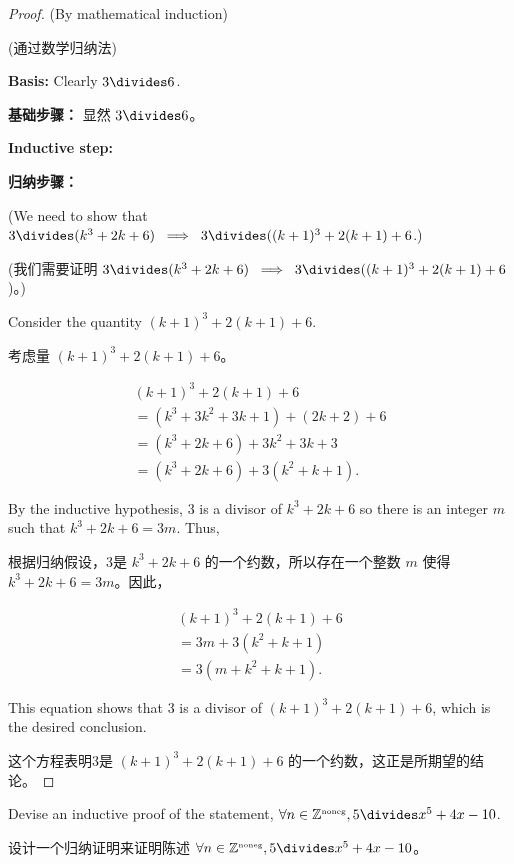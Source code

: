\begin{proof}
(By mathematical induction)

(通过数学归纳法)

{\bf Basis:} Clearly $3 \divides 6$.

{\bf 基础步骤：} 显然 $3 \divides 6$。

{\bf Inductive step:} 

{\bf 归纳步骤：}

\noindent (We need to show that $3 \divides (k^3 + 2k + 6) \; \implies \; 3 \divides ((k+1)^3 + 2(k+1) + 6$.)

\noindent (我们需要证明 $3 \divides (k^3 + 2k + 6) \; \implies \; 3 \divides ((k+1)^3 + 2(k+1) + 6$)。)

Consider the quantity $(k+1)^3 + 2(k+1) + 6$.

考虑量 $(k+1)^3 + 2(k+1) + 6$。

\begin{gather*}
   (k+1)^3 + 2(k+1) + 6 \\
 = (k^3 + 3k^2 + 3k + 1) + (2k + 2) + 6\\
 = (k^3 + 2k + 6) + 3k^2 + 3k + 3\\
 = (k^3 + 2k + 6) + 3(k^2 + k + 1).
\end{gather*}

By the inductive hypothesis, 3 is a divisor of $k^3 + 2k + 6$ so there
is an integer $m$ such that $k^3 + 2k + 6 = 3m$.
Thus,

根据归纳假设，3是 $k^3 + 2k + 6$ 的一个约数，所以存在一个整数 $m$ 使得 $k^3 + 2k + 6 = 3m$。因此，

\begin{gather*}
(k+1)^3 + 2(k+1) + 6 \\
= 3m + 3(k^2 + k + 1) \\
= 3(m + k^2 + k + 1).
\end{gather*}

This equation shows that 3 is a divisor of $(k+1)^3 + 2(k+1) + 6$, which
is the desired conclusion.

这个方程表明3是 $(k+1)^3 + 2(k+1) + 6$ 的一个约数，这正是所期望的结论。
\end{proof}

\begin{exer}
Devise an inductive proof of the statement, $\forall n \in \Naturals, 5 \divides x^5+4x-10$.

设计一个归纳证明来证明陈述 $\forall n \in \Naturals, 5 \divides x^5+4x-10$。
\end{exer}

